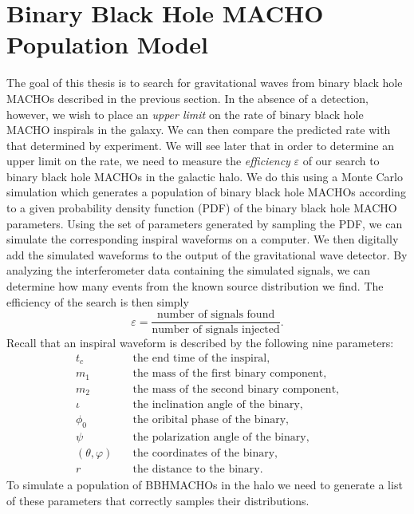 \section{Binary Black Hole MACHO Population Model}
\label{s:bbhmachopopulation}

The goal of this thesis is to search for gravitational waves from binary black
hole MACHOs described in the previous section. In the absence of a detection,
however, we wish to place an \emph{upper limit} on the rate of binary black
hole MACHO inspirals in the galaxy. We can then compare the predicted rate
with that determined by experiment. We will see later that in order to
determine an upper limit on the rate, we need to measure the \emph{efficiency}
$\varepsilon$ of our search to binary black hole MACHOs in the galactic halo.
We do this using a Monte Carlo simulation which generates a population of
binary black hole MACHOs according to a given probability density function
(PDF) of the binary black hole MACHO parameters. Using the set of parameters
generated by sampling the PDF, we can simulate the corresponding inspiral
waveforms on a computer. We then digitally add the simulated waveforms to the
output of the gravitational wave detector. By analyzing the interferometer
data containing the simulated signals, we can determine how many events from
the known source distribution we find. The efficiency of the
search is then simply
\begin{equation}
\varepsilon = 
\frac{\textrm{number of signals found}}{\textrm{number of signals injected}}.
\end{equation}
Recall that an inspiral waveform is described by the following nine 
parameters:
\begin{equation*}
\begin{split}
t_c &\quad \textrm{the end time of the inspiral}, \\
m_1 &\quad \textrm{the mass of the first binary component}, \\
m_2 &\quad \textrm{the mass of the second binary component}, \\
\iota &\quad \textrm{the inclination angle of the binary}, \\
\phi_0 &\quad \textrm{the oribital phase of the binary}, \\
\psi &\quad \textrm{the polarization angle of the binary}, \\
(\theta,\varphi) &\quad \textrm{the coordinates of the binary},\\
r  &\quad \textrm{the distance to the binary}.
\end{split}
\end{equation*}
To simulate a population of BBHMACHOs in the halo we need to generate a list
of these parameters that correctly samples their distributions.

